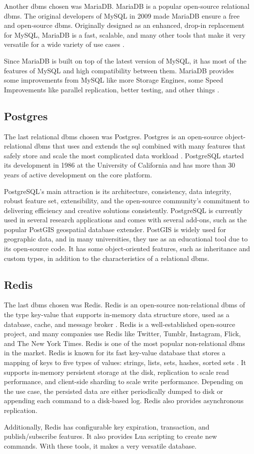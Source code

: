 Another \gls{dbms} chosen was MariaDB. MariaDB is a popular open-source relational \gls{dbms}. The original developers of MySQL in 2009 made MariaDB ensure a free and open-source \gls{dbms}. Originally designed as an enhanced, drop-in replacement for MySQL, MariaDB is a fast, scalable, and many other tools that make it very versatile for a wide variety of use cases \cite{kenler2015mariadb}.

Since MariaDB is built on top of the latest version of MySQL, it has most of the features of MySQL and high compatibility between them. MariaDB provides some improvements from MySQL like more Storage Engines, some Speed Improvements like parallel replication, better testing, and other things \cite{kenler2015mariadb}.

\subsection{Postgres}

The last relational \gls{dbms} chosen was Postgres. Postgres is an open-source object-relational \gls{dbms} that uses and extends the \gls{sql}  combined with many features that safely store and scale the most complicated data workload \cite{stonebraker1991object}. PostgreSQL started its development in 1986 at the University of California and has more than 30 years of active development on the core platform.

PostgreSQL's main attraction is its architecture, consistency, data integrity, robust feature set, extensibility, and the open-source community's commitment to delivering efficiency and creative solutions consistently. PostgreSQL is currently used in several research applications and comes with several add-ons, such as the popular PostGIS geospatial database extender. PostGIS is widely used for geographic data, and in many universities, they use as an educational tool due to its open-source code. It has some object-oriented features, such as inheritance and custom types, in addition to the characteristics of a relational \gls{dbms}.


\subsection{Redis}

The last \gls{dbms} chosen was Redis. Redis is an open-source non-relational \gls{dbms} of the type key-value that supports in-memory data structure store, used as a database, cache, and message broker \cite{da2015redis}.
Redis is a well-established open-source project, and many companies use Redis like Twitter, Tumblr, Instagram, Flick, and The New York Times. Redis is one of the most popular non-relational \gls{dbms} in the market\cite{da2015redis}.
Redis is known for its fast key-value database that stores a mapping of keys to five types of values: strings, lists, sets, hashes, sorted sets \cite{10.55552505464,redis}. It supports in-memory persistent storage at the disk, replication to scale read performance, and client-side sharding to scale write performance. Depending on the use case, the persisted data are either periodically dumped to disk or appending each command to a disk-based log. Redis also provides asynchronous replication\cite{10.55552505464,redis}. 

Additionally, Redis has configurable key expiration, transaction, and publish/subscribe features. It also provides Lua scripting to create new commands. With these tools, it makes a very versatile database\cite{da2015redis,redis}.